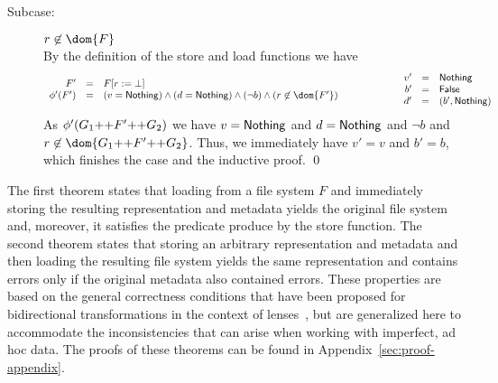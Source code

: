 {\begin{description}
\begin{description}
\item[Subcase:] $r \not\in \dom{F}$\\[1ex]
%
By the definition of the store and load functions we have
\[
\begin{array}{rcl}
F' &=& \FDelete{F}{r}\\
\phi'(F') &=& (v = \Nothing) \wedge (d = \Nothing) \wedge (\neg b) \wedge (r \not\in \dom{F'})\\
\end{array}\hspace*{2cm}\begin{array}{rcl}
v' &=& \Nothing\\
b' &=& \False\\
d' &=& (b',\Nothing)\\
\end{array}
\]
As $\phi'(G_1 \text{++} F' \text{++} G_2)$ we have $v = \mathsf{Nothing}$ and $d
= \mathsf{Nothing}$ and $\neg b$ and $r \not\in \dom{G_1 \FAppend F' \FAppend
  G_2}$. Thus, we immediately have $v' = v$ and $b' = b$, which finishes the case and
the inductive proof. \hfill \qed
\end{description}
\end{description}}

\smallskip

\noindent The first theorem states that loading from a file system $F$
and immediately storing the resulting representation and metadata
yields the original file system and, moreover, it satisfies the
predicate produce by the store function. The second theorem states
that storing an arbitrary representation and metadata and then loading
the resulting file system yields the same representation and contains
errors only if the original metadata also contained errors. These
properties are based on the general correctness conditions that have
been proposed for bidirectional transformations in the context of
lenses~\cite{lenses}, but are generalized here to accommodate the
inconsistencies that can arise when working with imperfect, ad hoc
data. The proofs of these theorems can be found in
Appendix~\ref{sec:proof-appendix}. 

